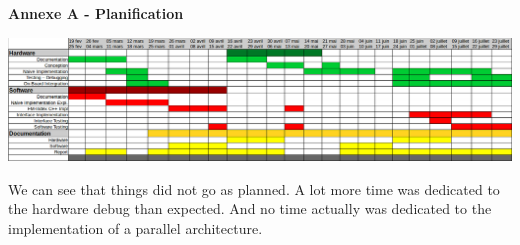 \begin{center}
{\Large \textbf{Annexe A - Planification}} \newline
\end{center}
\thispagestyle{plain}
\label{AppendixA} %
\begin{minipage}[t]{0.5\textwidth}
\includegraphics[angle=270, scale = 0.45]{Figures/final_gant.png}
\end{minipage}
\begin{minipage}[t]{0.5\textwidth}
We can see that things did not go as planned. A lot more time was dedicated to the hardware debug than expected. And no time actually was dedicated to the implementation of a parallel architecture. \\


\end{minipage}
